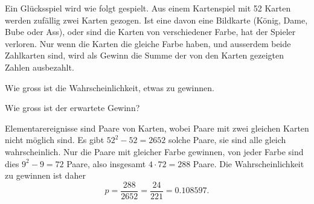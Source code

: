 Ein Glücksspiel wird wie folgt gespielt. Aus einem Kartenspiel
mit 52 Karten werden zufällig zwei Karten gezogen. Ist eine
davon eine Bildkarte (König, Dame, Bube oder Ass), oder sind die
Karten von verschiedener Farbe, hat der Spieler verloren. Nur wenn
die Karten die gleiche Farbe haben, und ausserdem beide Zahlkarten
sind, wird als Gewinn die Summe der von den Karten gezeigten Zahlen
ausbezahlt.
\begin{teilaufgaben}
\item Wie gross ist die Wahrscheinlichkeit, etwas zu gewinnen.
\item Wie gross ist der erwartete Gewinn?
\end{teilaufgaben}


\begin{loesung}
\begin{teilaufgaben}
\item
Elementarereignisse sind Paare von Karten, wobei Paare mit zwei
gleichen Karten nicht möglich sind. Es gibt $52^2-52=2652$ solche
Paare, sie sind alle gleich wahrscheinlich. Nur die Paare mit gleicher
Farbe gewinnen, von jeder Farbe sind dies $9^2-9=72$ Paare, also
insgesamt $4\cdot 72=288$ Paare. Die Wahrscheinlichkeit zu gewinnen
ist daher
\[
p=\frac{288}{2652}=\frac{24}{221}=0.108597.
\]


\end{teilaufgaben}
\end{loesung}

